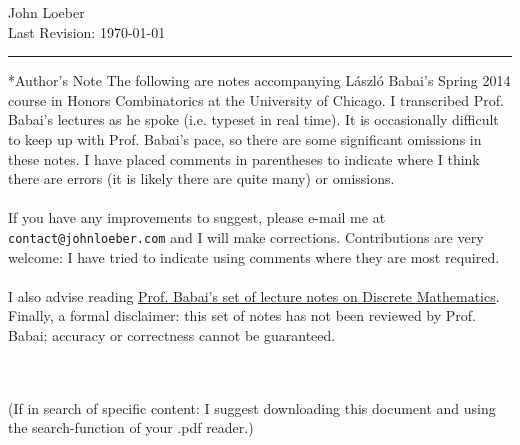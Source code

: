 \documentclass[12pt]{article}
\theoremstyle{remark}
\begin{document}
\hfill John Loeber\\
 \hfill Last Revision: \today
\vspace{1.2pt}
\hrule
\begin{section}*{Author's Note}
The following are notes accompanying L\'aszl\'o Babai's Spring 2014 course in Honors Combinatorics at the University of Chicago. I transcribed Prof. Babai's lectures as he spoke (i.e. typeset in real time). It is occasionally difficult to keep up with Prof. Babai's pace, so there are some significant omissions in these notes. I have placed comments in parentheses to indicate where I think there are errors (it is likely there are quite many) or omissions.
\\\\
If you have any improvements to suggest, please e-mail me at \texttt{contact@johnloeber.com} and I will make corrections. Contributions are very welcome: I have tried to indicate using comments where they are most required.\\\\I also advise reading \href{http://people.cs.uchicago.edu/~laci/14comb/index.html\#texts}{Prof. Babai's set of lecture notes on Discrete Mathematics}. Finally, a formal disclaimer: this set of notes has not been reviewed by Prof. Babai; accuracy or correctness cannot be guaranteed.
\end{section}
\newpage
{}
\\\\
(If in search of specific content: I suggest downloading this document and using the search-function of your .pdf reader.)
\end{document}
